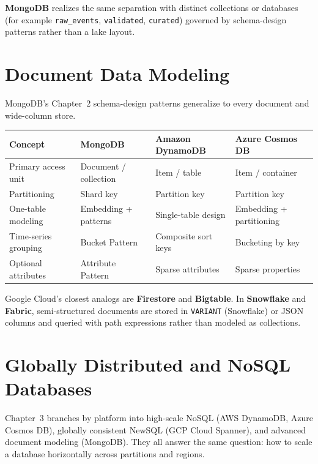 \noindent \textbf{MongoDB} realizes the same separation with distinct collections or databases
(for example \texttt{raw\_events}, \texttt{validated}, \texttt{curated}) governed by schema-design
patterns rather than a lake layout.

\section{Document Data Modeling}
%
MongoDB's Chapter~2 schema-design patterns generalize to every document and wide-column store.

\begin{center}
\footnotesize
\begin{tabular}{@{}p{3.0cm}p{3.2cm}p{3.2cm}p{3.0cm}@{}}
\toprule
\textbf{Concept} & \textbf{MongoDB} & \textbf{Amazon DynamoDB} & \textbf{Azure Cosmos DB} \\
\midrule
Primary access unit & Document / collection & Item / table & Item / container \\
Partitioning & Shard key & Partition key & Partition key \\
One-table modeling & Embedding + patterns & Single-table design & Embedding + partitioning \\
Time-series grouping & Bucket Pattern & Composite sort keys & Bucketing by key \\
Optional attributes & Attribute Pattern & Sparse attributes & Sparse properties \\
\bottomrule
\end{tabular}
\end{center}

\noindent Google Cloud's closest analogs are \textbf{Firestore} and \textbf{Bigtable}. In
\textbf{Snowflake} and \textbf{Fabric}, semi-structured documents are stored in \texttt{VARIANT}
(Snowflake) or JSON columns and queried with path expressions rather than modeled as collections.

\section{Globally Distributed and NoSQL Databases}
%
Chapter~3 branches by platform into high-scale NoSQL (AWS DynamoDB, Azure Cosmos DB), globally
consistent NewSQL (GCP Cloud Spanner), and advanced document modeling (MongoDB). They all answer
the same question: how to scale a database horizontally across partitions and regions.

